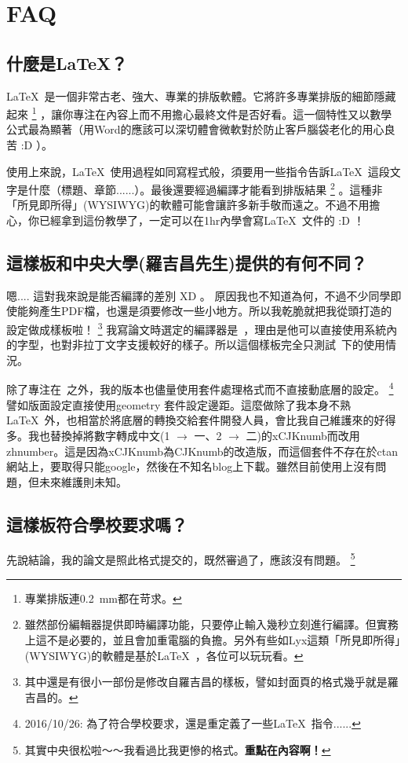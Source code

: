 \documentclass[class=NCU_thesis, crop=false, float=true]{standalone}
\begin{document}
\let\orilabel\label %

\chapter{FAQ}
\label{sec:c_faq}
\section{什麼是\LaTeX ？}
\LaTeX\  是一個非常古老、強大、專業的排版軟體。它將許多專業排版的細節隱藏起來
\footnote{專業排版連\SI{0.2}{\milli\metre}都在苛求。}
，讓你專注在內容上而不用擔心最終文件是否好看。這一個特性又以數學公式最為顯著（用Word的應該可以深切體會微軟對於防止客戶腦袋老化的用心良苦 :D ）。

使用上來說，\LaTeX\ 使用過程如同寫程式般，須要用一些指令告訴\LaTeX\ 這段文字是什麼（標題、章節......）。最後還要經過編譯才能看到排版結果
\footnote{雖然部份編輯器提供即時編譯功能，只要停止輸入幾秒立刻進行編譯。但實務上這不是必要的，並且會加重電腦的負擔。另外有些如Lyx這類「所見即所得」(WYSIWYG)的軟體是基於\LaTeX\ ，各位可以玩玩看。}
。這種非「所見即所得」(WYSIWYG)的軟體可能會讓許多新手敬而遠之。不過不用擔心，你已經拿到這份教學了，一定可以在1hr內學會寫\LaTeX\ 文件的 :D ！

\section{這樣板和中央大學(羅吉昌先生)提供的有何不同？}
嗯.... 這對我來說是能否編譯的差別 XD 。 原因我也不知道為何，不過不少同學即使能夠產生PDF檔，也還是須要修改一些小地方。所以我乾脆就把我從頭打造的設定做成樣板啦！
\footnote{其中還是有很小一部份是修改自羅吉昌的樣板，譬如封面頁的格式幾乎就是羅吉昌的。}
我寫論文時選定的編譯器是\XeLaTeX\  ，理由是他可以直接使用系統內的字型，也對非拉丁文字支援較好的樣子。所以這個樣板完全只測試\XeLaTeX\ 下的使用情況。

除了專注在\XeLaTeX\ 之外，我的版本也儘量使用套件處理格式而不直接動底層的設定。
\footnote{2016/10/26: 為了符合學校要求，還是重定義了一些\LaTeX\ 指令......}
譬如版面設定直接使用geometry 套件設定邊距。這麼做除了我本身不熟\LaTeX\ 外，也相當於將底層的轉換交給套件開發人員，會比我自己維護來的好得多。我也替換掉將數字轉成中文(1 $\rightarrow$ 一、2 $\rightarrow$ 二)的xCJKnumb而改用zhnumber。這是因為xCJKnumb為CJKnumb的改造版，而這個套件不存在於ctan網站上，要取得只能google，然後在不知名blog上下載。雖然目前使用上沒有問題，但未來維護則未知。

\section{這樣板符合學校要求嗎？}
先說結論，我的論文是照此格式提交的，既然審過了，應該沒有問題。
\footnote{其實中央很松啦～～我看過比我更慘的格式。\textbf{重點在內容啊！}}
\end{document}
